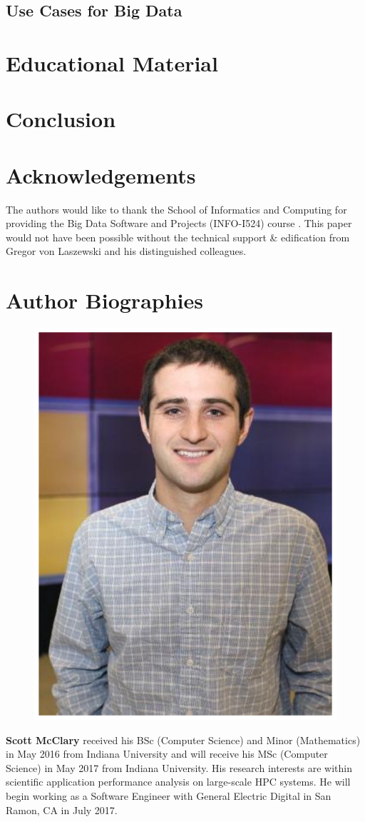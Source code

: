 \documentclass[9pt,twocolumn,twoside]{../../project/styles/osajnl} %
\begin{document}
\subsection{Use Cases for Big Data} \label{big}

\section{Educational Material} \label{educational}

\section{Conclusion} \label{conclusion}

\section*{Acknowledgements}
The authors would like to thank the School of Informatics and
Computing for providing the Big Data Software and Projects (INFO-I524)
course \cite{www-i524}. This paper would not have been possible
without the technical support \& edification from Gregor von Laszewski
and his distinguished colleagues.

 
\section*{Author Biographies}
\begingroup
\setlength\intextsep{0pt}
\begin{minipage}[t][3.2cm][t]{1.0\columnwidth} 
  \begin{figure}
    \includegraphics[width=0.25\columnwidth]{images/scott_mcclary}
  \end{figure}
  \noindent
  {\bfseries Scott McClary} received his BSc (Computer Science) and
  Minor (Mathematics) in May 2016 from Indiana University and will
  receive his MSc (Computer Science) in May 2017 from Indiana
  University. His research interests are within scientific application
  performance analysis on large-scale HPC systems. He will begin
  working as a Software Engineer with General Electric Digital in San
  Ramon, CA in July 2017.
\end{minipage}
\endgroup
\end{document}
